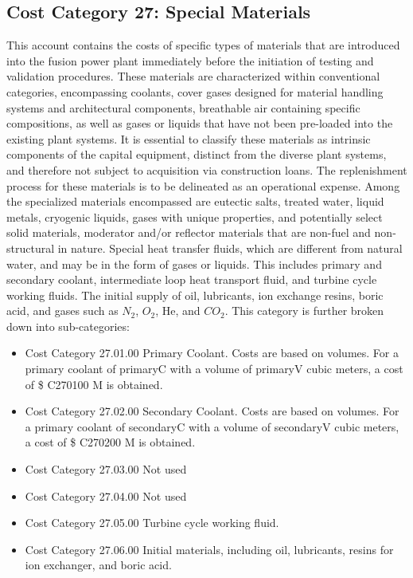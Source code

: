 \subsection{Cost Category 27: Special Materials}

This account contains the costs of specific types of materials that are introduced into the fusion power plant immediately before the initiation of testing and validation procedures. These materials are characterized within conventional categories, encompassing coolants, cover gases designed for material handling systems and architectural components, breathable air containing specific compositions, as well as gases or liquids that have not been pre-loaded into the existing plant systems. It is essential to classify these materials as intrinsic components of the capital equipment, distinct from the diverse plant systems, and therefore not subject to acquisition via construction loans. The replenishment process for  these materials is to be delineated as an operational expense. Among the specialized materials encompassed are eutectic salts, treated water, liquid metals,  cryogenic liquids, gases with unique properties, and potentially select solid materials, moderator and/or reflector materials that are non-fuel and non-structural in nature. Special heat transfer fluids, which are different from natural water, and may be in the form of gases or liquids. This includes primary and secondary coolant, intermediate loop heat transport fluid, and turbine cycle working fluids. The initial supply of oil, lubricants, ion exchange resins, boric acid, and gases such as $N_2$, $O_2$, He, and $CO_2$.
This category is further broken down into sub-categories:

\begin{itemize}
    \item Cost Category 27.01.00 Primary Coolant. Costs are based on volumes. For a primary coolant of primaryC with a volume of primaryV cubic meters, a cost of \$ C270100 M is obtained.  
    \item Cost Category 27.02.00 Secondary Coolant. Costs are based on volumes. For a primary coolant of secondaryC with a volume of secondaryV cubic meters, a cost of \$ C270200 M is obtained.
    \item Cost Category 27.03.00 Not used
    \item Cost Category 27.04.00 Not used
    \item Cost Category 27.05.00 Turbine cycle working fluid.
    \item Cost Category 27.06.00 Initial materials, including oil, lubricants, resins for ion exchanger, and boric acid.
\end{itemize}

